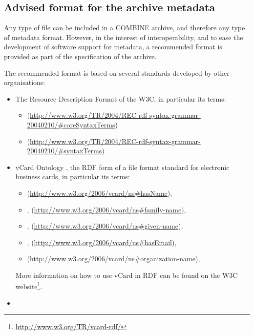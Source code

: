 \subsection{Advised format for the archive metadata}

Any type of file can be included in a COMBINE archive, and therefore any 
type of metadata format. However, in the interest of interoperability, 
and to ease the development of software support for metadata, a 
recommended format is provided as part of the specification of the 
archive. 

The recommended format is based on several standards developed by other 
organisations: 

\begin{itemize}
	\item  {
	
     The Resource Description Format \citep{RDF} of the W3C, in particular its terms:
     \begin{itemize}
		\item {} (\url{http://www.w3.org/TR/2004/REC-rdf-syntax-grammar-20040210/#coreSyntaxTerms})
		\item {} (\url{http://www.w3.org/TR/2004/REC-rdf-syntax-grammar-20040210/#syntaxTerms})
	\end{itemize}
	}
	\item  {

	vCard Ontology \citep{vCardOnto}, the RDF form of a file format standard for electronic business 
    cards, in particular its terms:
    	\begin{itemize}
		\item {} (\url{http://www.w3.org/2006/vcard/ns#hasName}), 
		\item {}, (\url{http://www.w3.org/2006/vcard/ns#family-name}),
		\item {}, (\url{http://www.w3.org/2006/vcard/ns#given-name}),
		\item {}, (\url{http://www.w3.org/2006/vcard/ns#hasEmail}),
		\item {} (\url{http://www.w3.org/2006/vcard/ns#organization-name}),
	\end{itemize}

	More information on how to use vCard in RDF can be found 
    on the W3C website\footnote{\url{http://www.w3.org/TR/vcard-rdf/}}.
	
	}
	\item {
	
}
\end{itemize}
